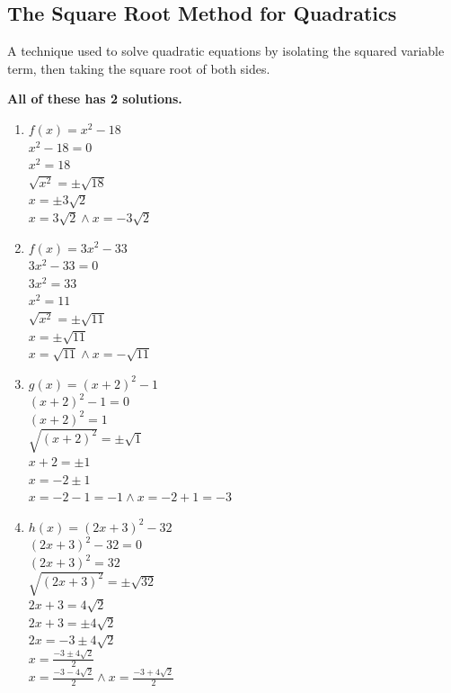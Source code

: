 \subsection{The Square Root Method for Quadratics}
\begin{definition}
  A technique used to solve quadratic equations by isolating the squared variable term, then taking the square root of both sides.
\end{definition}
\begin{example}
  \hfill

  
  \textbf{All of these has 2 solutions.}
  \begin{enumerate}
  \item $f(x) = x^2  - 18$ \\
    $x^2 - 18 = 0$ \\
    $x^2 = 18$ \\
    $\sqrt{x^2} = \pm \sqrt{18}$ \\
    $x = \pm 3\sqrt{2}$ \\
    $x = 3\sqrt{2} \land x = -3\sqrt{2}$
  \item $f(x) = 3x^2 - 33$ \\
    $3x^2 - 33 = 0$ \\
    $3x^2 = 33$ \\
    $x^2 = 11$ \\
    $\sqrt{x^2} = \pm \sqrt{11}$ \\
    $x = \pm \sqrt{11}$ \\
    $x = \sqrt{11} \land x = -\sqrt{11}$
  \item $g(x) = (x + 2)^2 - 1$ \\
    $(x + 2)^2 - 1 = 0$ \\
    $(x + 2)^2 = 1$ \\
    $\sqrt{(x + 2)^2} = \pm \sqrt{1}$ \\
    $x + 2 = \pm 1$ \\
    $x = -2 \pm 1$ \\
    $x = -2 - 1 = -1 \land x = -2 + 1 = -3$
  \item $h(x) = (2x + 3)^2 - 32$ \\
    $(2x + 3)^2 - 32 = 0$ \\
    $(2x + 3)^2 = 32$ \\
    $\sqrt{(2x + 3)^2} = \pm \sqrt{32}$ \\
    $2x + 3 = 4\sqrt{2}$ \\
    $2x + 3 = \pm 4\sqrt{2}$ \\
    $2x = -3 \pm 4\sqrt{2}$ \\
    $x = \frac{-3 \pm 4\sqrt{2}}{2}$ \\
    $x = \frac{-3 - 4\sqrt{2}}{2} \land x = \frac{-3 + 4\sqrt{2}}{2}$
  \end{enumerate}
\end{example}

